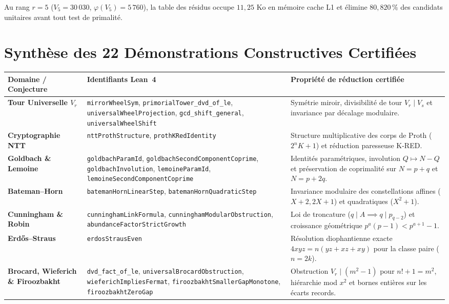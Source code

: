 \documentclass[11pt,a4paper]{article}
\begin{document}
Au rang $r = 5$ ($V_5 = 30\,030$, $\varphi(V_5) = 5\,760$), la table des résidus occupe $11,25\text{ Ko}$ en mémoire cache L1 et élimine $80,820\,\%$ des candidats unitaires avant tout test de primalité.

\section{Synthèse des 22 Démonstrations Constructives Certifiées}

\begin{table}[h]
\centering
\small
\begin{tabular}{p{3.5cm} p{5.2cm} p{5.5cm}}
\toprule
\textbf{Domaine / Conjecture} & \textbf{Identifiants Lean~4} & \textbf{Propriété de réduction certifiée} \\
\midrule
\textbf{Tour Universelle $V_r$} & \texttt{mirrorWheelSym}, \texttt{primorialTower\_dvd\_of\_le}, \texttt{universalWheelProjection}, \texttt{gcd\_shift\_general}, \texttt{universalWheelShift} & Symétrie miroir, divisibilité de tour $V_r \mid V_s$ et invariance par décalage modulaire. \\
\textbf{Cryptographie NTT} & \texttt{nttProthStructure}, \texttt{prothKRedIdentity} & Structure multiplicative des corps de Proth ($2^n K + 1$) et réduction paresseuse K-RED. \\
\textbf{Goldbach \& Lemoine} & \texttt{goldbachParamId}, \texttt{goldbachSecondComponentCoprime}, \texttt{goldbachInvolution}, \texttt{lemoineParamId}, \texttt{lemoineSecondComponentCoprime} & Identités paramétriques, involution $Q \mapsto N - Q$ et préservation de coprimalité sur $N = p+q$ et $N = p+2q$. \\
\textbf{Bateman--Horn} & \texttt{batemanHornLinearStep}, \texttt{batemanHornQuadraticStep} & Invariance modulaire des constellations affines ($X+2, 2X+1$) et quadratiques ($X^2+1$). \\
\textbf{Cunningham \& Robin} & \texttt{cunninghamLinkFormula}, \texttt{cunninghamModularObstruction}, \texttt{abundanceFactorStrictGrowth} & Loi de troncature ($q \mid A \implies q \mid p_{q-2}$) et croissance géométrique $p^a(p-1) < p^{a+1}-1$. \\
\textbf{Erdős--Straus} & \texttt{erdosStrausEven} & Résolution diophantienne exacte $4xyz = n(yz+xz+xy)$ pour la classe paire ($n = 2k$). \\
\textbf{Brocard, Wieferich \& Firoozbakht} & \texttt{dvd\_fact\_of\_le}, \texttt{universalBrocardObstruction}, \texttt{wieferichImpliesFermat}, \texttt{firoozbakhtSmallerGapMonotone}, \texttt{firoozbakhtZeroGap} & Obstruction $V_r \mid (m^2-1)$ pour $n!+1=m^2$, hiérarchie mod $x^2$ et bornes entières sur les écarts records. \\
\bottomrule
\end{tabular}
\end{table}
\end{document}
